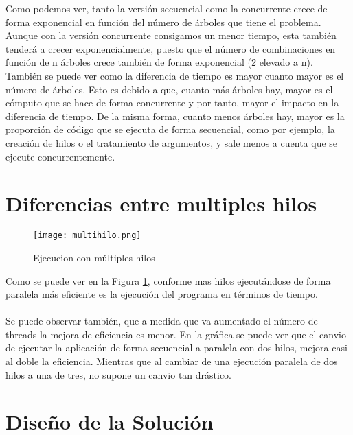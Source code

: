 \documentclass{article}
\begin{document}
Como podemos ver, tanto la versión secuencial como la concurrente 
crece de forma exponencial en función del número de árboles que tiene el problema.
Aunque con la versión concurrente consigamos un menor tiempo, esta también 
tenderá a crecer exponencialmente, puesto que el número de combinaciones
en función de n árboles crece también de forma exponencial (2 elevado a n).\\

También se puede ver como la diferencia de tiempo es mayor cuanto mayor es
el número de árboles. Esto es debido a que, cuanto más árboles hay, mayor es
el cómputo que se hace de forma concurrente y por tanto, mayor el impacto en
la diferencia de tiempo. De la misma forma, cuanto menos árboles hay, mayor es 
la proporción de código que se ejecuta de forma secuencial, como por ejemplo,
la creación de hilos o el tratamiento de argumentos, y sale menos a cuenta 
que se ejecute concurrentemente.

\section{Diferencias entre multiples hilos}
\begin{figure}[hbt!]
  \texttt{[image: multihilo.png]}
  \caption{Ejecucion con múltiples hilos}
  \label{fig:multhilos}
\end{figure}

Como se puede ver en la Figura \ref{fig:multhilos}, conforme mas hilos ejecutándose de forma paralela más eficiente es la ejecución del programa en términos de tiempo.
\\\\
Se puede observar también, que a medida que va aumentado el número de threads la mejora de eficiencia es menor. En la gráfica se puede ver que el canvio de ejecutar la aplicación de forma secuencial a paralela con dos hilos, mejora casi al doble la eficiencia. Mientras que al cambiar de una ejecución paralela de dos hilos a una de tres, no supone un canvio tan drástico.\\

\section{Diseño de la Solución}
\end{document}

